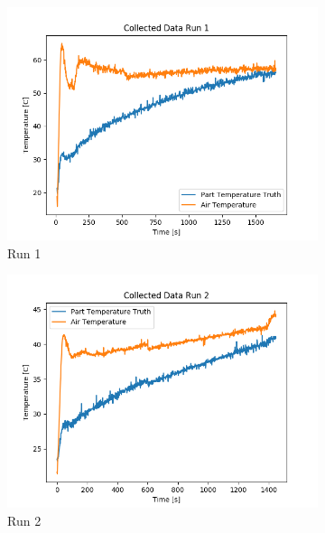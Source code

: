 \begin{figure}[ht]
    \begin{subfigure}{.33\linewidth}
        \centering
    	\includegraphics[width=\linewidth]{other/Raw_Data/1.png}
        \caption{Run 1}
    \end{subfigure}
    \begin{subfigure}{.33\linewidth}
        \centering
    	\includegraphics[width=\linewidth]{other/Raw_Data/2.png}
    	\caption{Run 2}
    \end{subfigure}
    \begin{subfigure}{.33\linewidth}
        \centering

\end{subfigure}
\end{figure}
